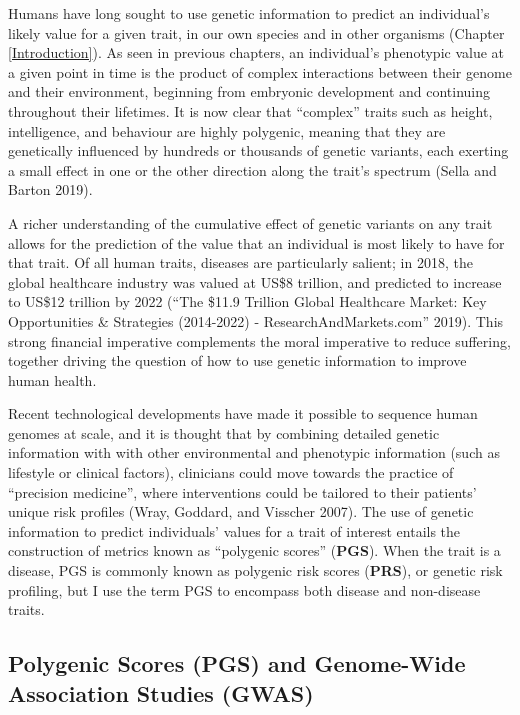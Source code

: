 \documentclass[
]{book}
\begin{document}
Humans have long sought to use genetic information to predict an individual's likely value for a given trait, in our own species and in other organisms (Chapter \ref{Introduction}). As seen in previous chapters, an individual's phenotypic value at a given point in time is the product of complex interactions between their genome and their environment, beginning from embryonic development and continuing throughout their lifetimes. It is now clear that ``complex'' traits such as height, intelligence, and behaviour are highly polygenic, meaning that they are genetically influenced by hundreds or thousands of genetic variants, each exerting a small effect in one or the other direction along the trait's spectrum (Sella and Barton 2019).

A richer understanding of the cumulative effect of genetic variants on any trait allows for the prediction of the value that an individual is most likely to have for that trait. Of all human traits, diseases are particularly salient; in 2018, the global healthcare industry was valued at US\$8 trillion, and predicted to increase to US\$12 trillion by 2022 ({``The \$11.9 {Trillion Global Healthcare Market}: {Key Opportunities} \& {Strategies} (2014-2022) - {ResearchAndMarkets}.com''} 2019). This strong financial imperative complements the moral imperative to reduce suffering, together driving the question of how to use genetic information to improve human health.

Recent technological developments have made it possible to sequence human genomes at scale, and it is thought that by combining detailed genetic information with with other environmental and phenotypic information (such as lifestyle or clinical factors), clinicians could move towards the practice of ``precision medicine'', where interventions could be tailored to their patients' unique risk profiles (Wray, Goddard, and Visscher 2007). The use of genetic information to predict individuals' values for a trait of interest entails the construction of metrics known as ``polygenic scores'' (\textbf{PGS}). When the trait is a disease, PGS is commonly known as polygenic risk scores (\textbf{PRS}), or genetic risk profiling, but I use the term PGS to encompass both disease and non-disease traits.

\hypertarget{polygenic-scores-pgs-and-genome-wide-association-studies-gwas}{%
\subsection{Polygenic Scores (PGS) and Genome-Wide Association Studies (GWAS)}\label{polygenic-scores-pgs-and-genome-wide-association-studies-gwas}}
\end{document}
